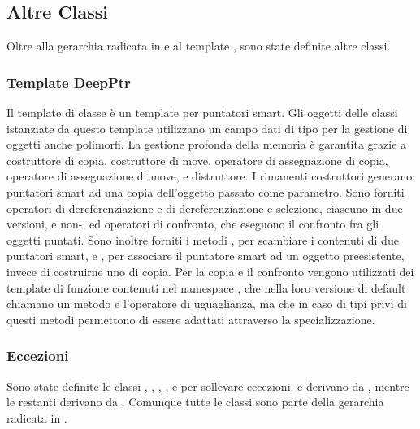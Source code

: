 \subsection{Altre Classi} %
\label{sub:altre_classi}
Oltre alla gerarchia radicata in  e al template , sono state definite altre classi.
\subsubsection{Template DeepPtr} %
\label{ssub:template_deepptr}
Il template di classe  è un template per puntatori smart. Gli oggetti delle classi istanziate da questo template utilizzano un campo dati di tipo  per la gestione di oggetti anche polimorfi. La gestione profonda della memoria è garantita grazie a costruttore di copia, costruttore di move, operatore di assegnazione di copia, operatore di assegnazione di move, e distruttore. I rimanenti costruttori generano puntatori smart ad una copia dell'oggetto passato come parametro. Sono forniti operatori di dereferenziazione e di dereferenziazione e selezione, ciascuno in due versioni,  e non-, ed operatori di confronto, che eseguono il confronto fra gli oggetti puntati. Sono inoltre forniti i metodi , per scambiare i contenuti di due puntatori smart, e , per associare il puntatore smart ad un oggetto preesistente, invece di costruirne uno di copia. Per la copia e il confronto vengono utilizzati dei template di funzione contenuti nel namespace , che nella loro versione di default chiamano un metodo  e l'operatore di uguaglianza, ma che in caso di tipi privi di questi metodi permettono di essere adattati attraverso la specializzazione.
\subsubsection{Eccezioni} %
\label{ssub:eccezioni}
Sono state definite le classi , , , , e  per sollevare eccezioni.  e  derivano da , mentre le restanti derivano da . Comunque tutte le classi sono parte della gerarchia radicata in .
